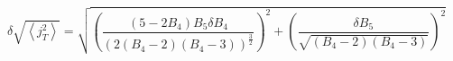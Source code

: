 \begin{equation}
\delta \sqrt{\left<j_T^2\right>} = \sqrt{ \left( \frac{\left(5-2 B_4 \right) B_5 \delta  B_4}{\left( 2\left(  B_4-2\right)\left( B_4-3\right)      \right)^{\frac{3}{2}}}\right)^2 + \left( \frac{\delta B_5}{\sqrt{\left( B_4-2\right)\left( B_4-3\right)}}      \right)^2  }
\end{equation}



